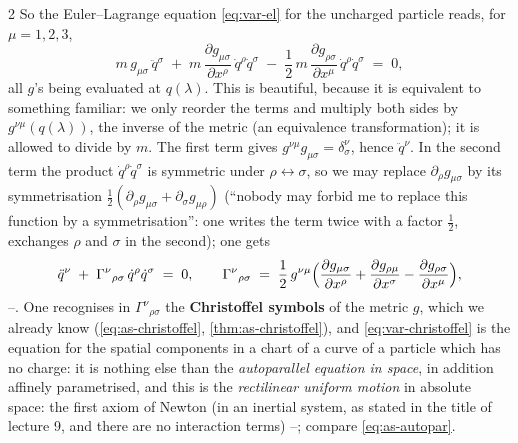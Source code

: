 \begin{paracol}{2}
So the Euler--Lagrange equation \eqref{eq:var-el} for the uncharged particle reads, for $\mu=1,2,3$,
\begin{equation}\label{eq:var-elfree}
  m\,g_{\mu\sigma}\,\ddot q^\sigma\;+\;m\,\frac{\partial g_{\mu\sigma}}{\partial x^\rho}\,\dot q^\rho\dot q^\sigma\;-\;\frac12\,m\,\frac{\partial g_{\rho\sigma}}{\partial x^\mu}\,\dot q^\rho\dot q^\sigma\;=\;0,
\end{equation}
all $g$'s being evaluated at $q(\lambda)$. This is beautiful, because it is equivalent to something familiar: we only reorder the terms and multiply both sides by $g^{\nu\mu}(q(\lambda))$, the inverse of the metric (an equivalence transformation); it is allowed to divide by $m$. The first term gives $g^{\nu\mu}g_{\mu\sigma}=\delta^\nu_\sigma$, hence $\ddot q^\nu$. In the second term the product $\dot q^\rho\dot q^\sigma$ is symmetric under $\rho\leftrightarrow\sigma$, so we may replace $\partial_\rho g_{\mu\sigma}$ by its symmetrisation $\tfrac12(\partial_\rho g_{\mu\sigma}+\partial_\sigma g_{\mu\rho})$ (``nobody may forbid me to replace this function by a symmetrisation'': one writes the term twice with a factor $\tfrac12$, exchanges $\rho$ and $\sigma$ in the second); one gets
\begin{equation}\label{eq:var-christoffel}
  \ddot q^\nu\;+\;\Gamma^\nu{}_{\rho\sigma}\,\dot q^\rho\dot q^\sigma\;=\;0,\qquad\Gamma^\nu{}_{\rho\sigma}\;=\;\frac12\,g^{\nu\mu}\Bigl(\frac{\partial g_{\mu\sigma}}{\partial x^\rho}+\frac{\partial g_{\rho\mu}}{\partial x^\sigma}-\frac{\partial g_{\rho\sigma}}{\partial x^\mu}\Bigr),
\end{equation}
--. One recognises in $\Gamma^\nu{}_{\rho\sigma}$ the \textbf{Christoffel symbols} of the metric $g$, which we already know (\cref{eq:as-christoffel}, \cref{thm:as-christoffel}), and \eqref{eq:var-christoffel} is the equation for the spatial components in a chart of a curve of a particle which has no charge: it is nothing else than the \emph{autoparallel equation in space}, in addition affinely parametrised, and this is the \emph{rectilinear uniform motion} in absolute space: the first axiom of Newton (in an inertial system, as stated in the title of lecture 9, and there are no interaction terms) --; compare \eqref{eq:as-autopar}.


\end{paracol}
